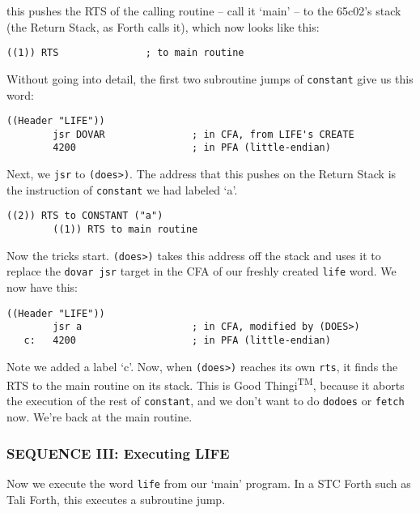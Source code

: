this pushes the RTS of the calling routine -- call it `main' -- to the 65c02's
stack (the Return Stack, as Forth calls it), which now looks like this:

\begin{lstlisting}[frame=single]
        ((1)) RTS               ; to main routine 
\end{lstlisting}

Without going into detail, the first two subroutine jumps of \texttt{constant} give us
this word: 

\begin{lstlisting}[frame=single]
        ((Header "LIFE"))
        jsr DOVAR               ; in CFA, from LIFE's CREATE
        4200                    ; in PFA (little-endian)
\end{lstlisting}

Next, we \texttt{jsr} to \texttt{(does>)}. The address that this pushes on the Return Stack is
the instruction of \texttt{constant} we had labeled `a'. 

\begin{lstlisting}[frame=single]
        ((2)) RTS to CONSTANT ("a") 
        ((1)) RTS to main routine 
\end{lstlisting}

Now the tricks start. \texttt{(does>)} takes this address off the stack and uses
it to replace the \texttt{dovar jsr} target in the CFA of our freshly created
\texttt{life} word. We now have this: 

\begin{lstlisting}[frame=single]
        ((Header "LIFE"))
        jsr a                   ; in CFA, modified by (DOES>)
   c:   4200                    ; in PFA (little-endian)
\end{lstlisting}

Note we added a label `c'. Now, when \texttt{(does>)} reaches its own
\texttt{rts}, it finds the RTS to the main routine on its stack. This is Good
Thingi\textsuperscript{TM}, because it aborts the execution of the rest of
\texttt{constant}, and we don't want to do \texttt{dodoes} or \texttt{fetch}
now.  We're back at the main routine. 


\subsubsection{SEQUENCE III: Executing LIFE}

Now we execute the word \texttt{life} from our `main' program. In a STC Forth
such as Tali Forth, this executes a subroutine jump.

